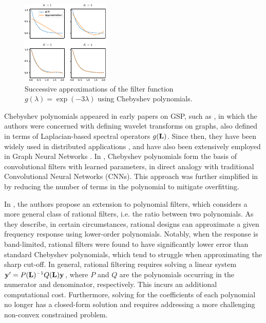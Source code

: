 \begin{figure}[t]
	\centering
		\includegraphics[width=0.55\linewidth]{Figures/cheb.pdf}
	\caption[Successive approximations of a filter function using Chebyshev polynomials.]{Successive approximations of the filter function $g(\lambda) = \exp(-3\lambda)$ using Chebyshev polynomials. }
	\label{fig:Chebyshev}
\end{figure}


Chebyshev polynomials appeared in early papers on GSP, such as \citep{Hammond2011}, in which the authors were concerned with defining wavelet transforms on graphs, also defined in terms of Laplacian-based spectral operators $g(\mathbf{L})$. Since then, they have been widely used in distributed applications \citep{Shuman2018}, and have also been extensively employed in Graph Neural Networks \citep{Gama2020}. In \cite{Defferrard2017}, Chebyshev polynomials form the basis of convolutional filters with learned parameters, in direct analogy with traditional Convolutional Neural Networks (CNNs). This approach was further simplified in \cite{Kipf2017} by reducing the number of terms in the polynomial to mitigate overfitting.

In \cite{Rimleanscaia2020,Tseng2020}, the authors propose an extension to polynomial filters, which considers a more general class of rational filters, i.e. the ratio between two polynomials. As they describe, in certain circumstances, rational designs can approximate a given frequency response using lower-order polynomials. Notably, when the response is band-limited, rational filters were found to have significantly lower error than standard Chebyshev polynomials, which tend to struggle when approximating the sharp cut-off. In general, rational filtering requires solving a linear system $\mathbf{y}' = P(\mathbf{L})^{-1} Q(\mathbf{L}) \mathbf{y}$, where $P$ and $Q$ are the polynomials occurring in the numerator and denominator, respectively. This incurs an additional computational cost. Furthermore, solving for the coefficients of each polynomial no longer has a closed-form solution and requires addressing a more challenging non-convex constrained problem.


